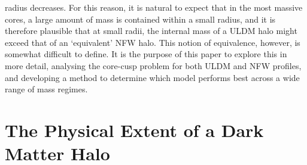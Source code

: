 \documentclass[a4paper,11pt]{article}
\begin{document}
radius decreases. For this reason, it is natural to expect that in the most massive cores, a large amount of mass is contained within a small radius, and it is therefore plausible that at small radii, the internal mass of a ULDM halo might exceed that of an `equivalent' NFW halo. This notion of equivalence, however, is somewhat difficult to define. It is the purpose of this paper to explore this in more detail, analysing the core-cusp problem for both ULDM and NFW profiles, and developing a method to determine which model performs best across a wide range of mass regimes. 


\section{The Physical Extent of a Dark Matter Halo}
\end{document}
